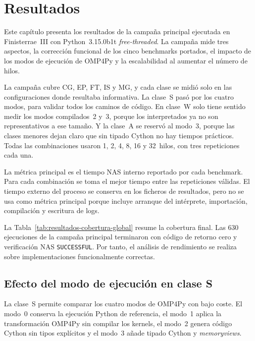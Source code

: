 \chapter{Resultados}
\label{chap:resultados}

Este capítulo presenta los resultados de la campaña principal ejecutada en
Finisterrae~III con Python~3.15.0b1t \emph{free-threaded}. La campaña mide tres
aspectos, la corrección funcional de los cinco benchmarks portados, el impacto
de los modos de ejecución de OMP4Py y la escalabilidad al aumentar el número de
hilos.

La campaña cubre CG, EP, FT, IS y MG, y cada clase se midió solo en las
configuraciones donde resultaba informativa.
La clase~S pasó por los cuatro modos, para validar todos los caminos de código.
En clase~W solo tiene sentido medir los modos compilados~2 y~3, porque los interpretados
ya no son representativos a ese tamaño. Y la clase~A se reservó al modo~3, porque
las clases menores dejan claro que sin tipado Cython no hay tiempos prácticos.
Todas las combinaciones usaron 1, 2, 4, 8, 16 y 32~hilos, con tres repeticiones
cada una.

La métrica principal es el tiempo NAS interno reportado por cada benchmark. Para
cada combinación se toma el mejor tiempo entre las repeticiones válidas. El
tiempo externo del proceso se conserva en los ficheros de resultados, pero no
se usa como métrica principal porque incluye arranque del intérprete,
importación, compilación y escritura de logs.



La Tabla~\ref{tab:resultados-cobertura-global} resume la cobertura final. Las
630 ejecuciones de la campaña principal terminaron con código de retorno cero y
verificación NAS \texttt{SUCCESSFUL}. Por tanto, el análisis de rendimiento se
realiza sobre implementaciones funcionalmente correctas.


\section{Efecto del modo de ejecución en clase S}
\label{sec:resultados-modos-s}

La clase~S permite comparar los cuatro modos de OMP4Py con bajo coste. El
modo~0 conserva la ejecución Python de referencia, el modo~1 aplica la
transformación OMP4Py sin compilar los kernels, el modo~2 genera código Cython
sin tipos explícitos y el modo~3 añade tipado Cython y \emph{memoryviews}.

